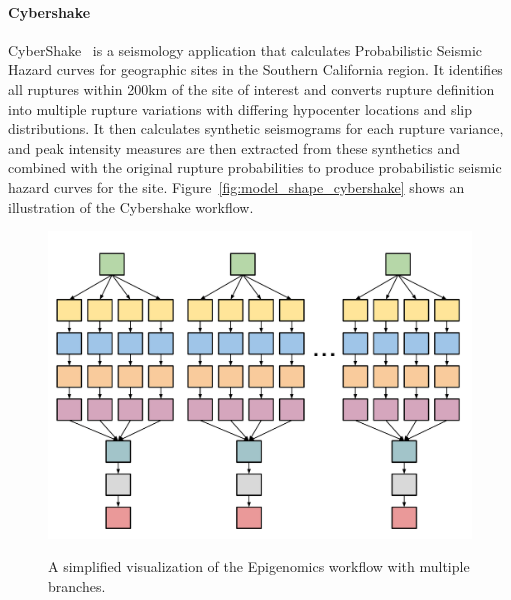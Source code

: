 \paragraph{\textbf{Cybershake}}
CyberShake~\cite{Graves2010} is a seismology application that calculates Probabilistic Seismic Hazard curves for geographic sites in the Southern California region. It identifies all ruptures within 200km of the site of interest and converts rupture definition into multiple rupture variations with differing hypocenter locations and slip distributions. It then calculates synthetic seismograms for each rupture variance, and peak intensity measures are then extracted from these synthetics and combined with the original rupture probabilities to produce probabilistic seismic hazard curves for the site. Figure~\ref{fig:model_shape_cybershake} shows an illustration of the Cybershake workflow.

\begin{figure}[htb]
	\centering
	\includegraphics[width=0.8\linewidth]{figures/workflowsim/genome_shape.pdf} \\
	\caption{A simplified visualization of the Epigenomics workflow with multiple branches.}
	\label{fig:model_shape_genome}
\end{figure}

